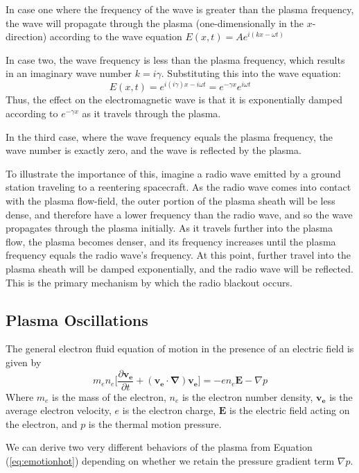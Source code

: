\documentclass[twocolumn]{article}
\begin{document}
In case one where the frequency of the wave is greater than the plasma frequency, the wave will propagate through the plasma (one-dimensionally in the $x$-direction) according to the wave equation $E(x,t) = Ae^{i(kx - \omega t)}$

In case two, the wave frequency is less than the plasma frequency, which results in an imaginary wave number $k = i\gamma$.
Substituting this into the wave equation:
\begin{equation}
	E(x,t) = e^{i(i\gamma)x - i\omega t} = e^{-\gamma x}e^{i\omega t}
\end{equation}
Thus, the effect on the electromagnetic wave is that it is exponentially damped according to $e^{-\gamma x}$ as it travels through the plasma.

In the third case, where the wave frequency equals the plasma frequency, the wave number is exactly zero, and the wave is reflected by the plasma.

To illustrate the importance of this, imagine a radio wave emitted by a ground station traveling to a reentering spacecraft.
As the radio wave comes into contact with the plasma flow-field, the outer portion of the plasma sheath will be less dense, and therefore have a lower frequency than the radio wave, and so the wave propagates through the plasma initially.
As it travels further into the plasma flow, the plasma becomes denser, and its frequency increases until the plasma frequency equals the radio wave's frequency.
At this point, further travel into the plasma sheath will be damped exponentially, and the radio wave will be reflected.
This is the primary mechanism by which the radio blackout occurs.
\subsection*{Plasma Oscillations}
The general electron fluid equation of motion in the presence of an electric field is given by
\begin{equation} \label{eq:emotionhot}
m_en_e \lbrack \frac{\partial \mathbf{v_e}}{\partial t} + \left( \mathbf{v_e} \cdot \mathbf{\nabla} \right) \mathbf{v_e} \rbrack = -en_e\mathbf{E} - \nabla p
\end{equation}
Where $m_e$ is the mass of the electron, $n_e$ is the electron number density, $\mathbf{v_e}$ is the average electron velocity, $e$ is the electron charge, $\mathbf{E}$ is the electric field acting on the electron, and $p$ is the thermal motion pressure.

We can derive two very different behaviors of the plasma from Equation (\ref{eq:emotionhot}) depending on whether we retain the pressure gradient term $\nabla p$.
\end{document}
